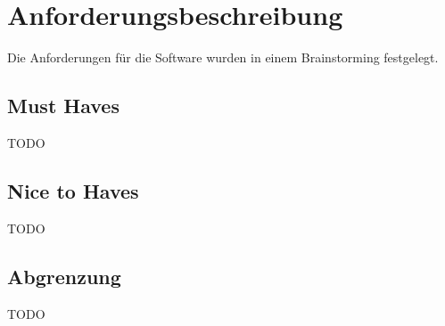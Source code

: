\section{Anforderungsbeschreibung}
\label{anforderungen}

Die Anforderungen für die Software wurden in einem Brainstorming festgelegt.

\subsection{Must Haves}
{\color{red}TODO}
\subsection{Nice to Haves}
{\color{red}TODO}
\subsection{Abgrenzung}
{\color{red}TODO}